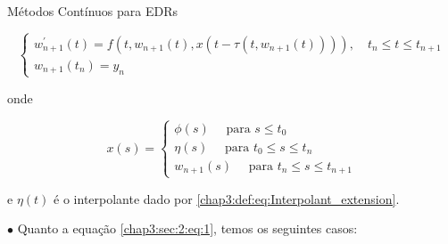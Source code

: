 \documentclass{beamer}
\theoremstyle{plain}
\theoremstyle{definition}
\begin{document}
\begin{frame}{Métodos Contínuos para EDRs}


    \begin{equation}
        \left\{\begin{array}{l}
                w_{n+1}^{\prime}(t)=f(t, w_{n+1}(t), x(t-\tau(t, w_{n+1}(t)))), \quad t_{n} \leq t \leq t_{n+1} \\
                w_{n+1}(t_{n})=y_{n}
        \end{array}\right.
        \label{chap3:sec:2:eq:1}
    \end{equation}

    onde

    $$
    x(s)=\left\{\begin{array}{l}
            \phi(s) \quad \text { para } s \leq t_{0} \\
            \eta(s) \quad \text { para } t_{0} \leq s \leq t_{n} \\
            w_{n+1}(s) \quad \text { para } t_{n} \leq s \leq t_{n+1}
    \end{array}\right.
    $$

    e \(\eta(t)\) é o interpolante dado por \ref{chap3:def:eq:Interpolant_extension}. 

    \phantom{aa} $\bullet$ Quanto a equação \eqref{chap3:sec:2:eq:1}, temos os seguintes casos:

\end{frame}


\end{document}
